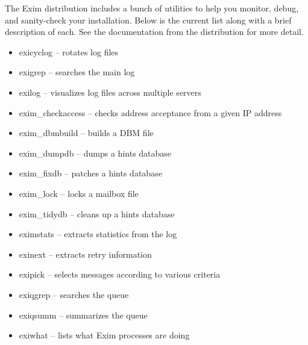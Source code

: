 \protect\hypertarget{part0026_split_043.htmlux5cux23_idIndexMarker2623}{}{}The
Exim distribution includes a bunch of utilities to help you monitor,
debug, and sanity-check your installation. Below is the current list
along with a brief description of each. See the documentation from the
distribution for more detail.

\begin{itemize}
\tightlist
\item
  \protect\hypertarget{part0026_split_043.htmlux5cux23_idIndexMarker2624}{}{}{exicyclog}
  -- rotates log files
\item
  \protect\hypertarget{part0026_split_043.htmlux5cux23_idIndexMarker2625}{}{}{exigrep}
  -- searches the main log
\item
  \protect\hypertarget{part0026_split_043.htmlux5cux23_idIndexMarker2626}{}{}{exilog}
  -- visualizes log files across multiple servers
\item
  \protect\hypertarget{part0026_split_043.htmlux5cux23_idIndexMarker2627}{}{}{exim\_checkaccess}
  -- checks address acceptance from a given IP address
\item
  \protect\hypertarget{part0026_split_043.htmlux5cux23_idIndexMarker2628}{}{}{exim\_dbmbuild}
  -- builds a DBM file
\item
  \protect\hypertarget{part0026_split_043.htmlux5cux23_idIndexMarker2629}{}{}{exim\_dumpdb}
  -- dumps a hints database
\item
  \protect\hypertarget{part0026_split_043.htmlux5cux23_idIndexMarker2630}{}{}{exim\_fixdb}
  -- patches a hints database
\item
  \protect\hypertarget{part0026_split_043.htmlux5cux23_idIndexMarker2631}{}{}{exim\_lock}
  -- locks a mailbox file
\item
  \protect\hypertarget{part0026_split_043.htmlux5cux23_idIndexMarker2632}{}{}{exim\_tidydb}
  -- cleans up a hints database
\item
  \protect\hypertarget{part0026_split_043.htmlux5cux23_idIndexMarker2633}{}{}{eximstats}
  -- extracts statistics from the log
\item
  \protect\hypertarget{part0026_split_043.htmlux5cux23_idIndexMarker2634}{}{}{exinext}
  -- extracts retry information
\item
  \protect\hypertarget{part0026_split_043.htmlux5cux23_idIndexMarker2635}{}{}{exipick}
  -- selects messages according to various criteria
\item
  \protect\hypertarget{part0026_split_043.htmlux5cux23_idIndexMarker2636}{}{}{exiqgrep}
  -- searches the queue
\item
  \protect\hypertarget{part0026_split_043.htmlux5cux23_idIndexMarker2637}{}{}{exiqsumm}
  -- summarizes the queue
\item
  \protect\hypertarget{part0026_split_043.htmlux5cux23_idIndexMarker2638}{}{}{exiwhat}
  -- lists what Exim processes are doing
\end{itemize}

